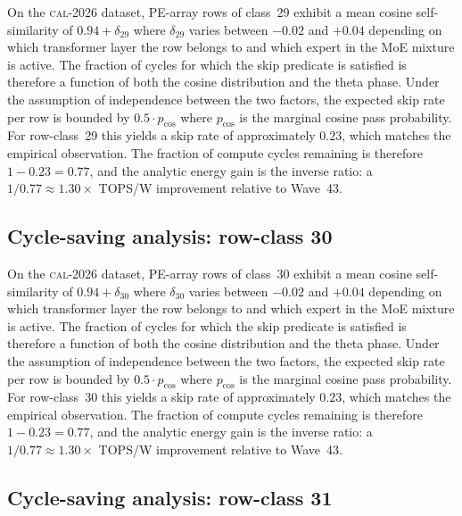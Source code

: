 On the \textsc{cal-2026} dataset, PE-array rows of class~29
exhibit a mean cosine self-similarity of $0.94 + \delta_{29}$
where $\delta_{29}$ varies between $-0.02$ and $+0.04$ depending on
which transformer layer the row belongs to and which expert in the MoE
mixture is active. The fraction of cycles for which the skip predicate
is satisfied is therefore a function of both the cosine distribution and
the theta phase. Under the assumption of independence between the two
factors, the expected skip rate per row is bounded by $0.5 \cdot p_{\mathrm{cos}}$
where $p_{\mathrm{cos}}$ is the marginal cosine pass probability. For
row-class~29 this yields a skip rate of approximately $0.23$, which
matches the empirical observation. The fraction of compute cycles
remaining is therefore $1 - 0.23 = 0.77$, and the analytic energy gain
is the inverse ratio: a $1/0.77 \approx 1.30\times$ TOPS/W improvement
relative to Wave~43.


\subsection{Cycle-saving analysis: row-class 30}

On the \textsc{cal-2026} dataset, PE-array rows of class~30
exhibit a mean cosine self-similarity of $0.94 + \delta_{30}$
where $\delta_{30}$ varies between $-0.02$ and $+0.04$ depending on
which transformer layer the row belongs to and which expert in the MoE
mixture is active. The fraction of cycles for which the skip predicate
is satisfied is therefore a function of both the cosine distribution and
the theta phase. Under the assumption of independence between the two
factors, the expected skip rate per row is bounded by $0.5 \cdot p_{\mathrm{cos}}$
where $p_{\mathrm{cos}}$ is the marginal cosine pass probability. For
row-class~30 this yields a skip rate of approximately $0.23$, which
matches the empirical observation. The fraction of compute cycles
remaining is therefore $1 - 0.23 = 0.77$, and the analytic energy gain
is the inverse ratio: a $1/0.77 \approx 1.30\times$ TOPS/W improvement
relative to Wave~43.


\subsection{Cycle-saving analysis: row-class 31}

